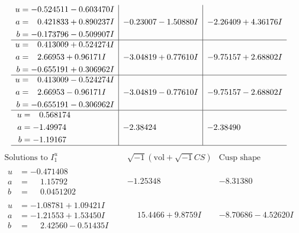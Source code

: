 \documentclass[1p]{elsarticle_modified}
\theoremstyle{definition}
\newcommand{\I}{\sqrt{-1}}
\begin{document}
$$\begin{array}{c|c|c}
\begin{aligned}
u &= -0.524511 - 0.603470 I \\
a &= \phantom{-}0.421833 + 0.890237 I \\
b &= -0.173796 - 0.509907 I\end{aligned}
 & -0.23007 - 1.50880 I & -2.26409 + 4.36176 I \\ \hline\begin{aligned}
u &= \phantom{-}0.413009 + 0.524274 I \\
a &= \phantom{-}2.66953 + 0.96171 I \\
b &= -0.655191 + 0.306962 I\end{aligned}
 & -3.04819 + 0.77610 I & -9.75157 + 2.68802 I \\ \hline\begin{aligned}
u &= \phantom{-}0.413009 - 0.524274 I \\
a &= \phantom{-}2.66953 - 0.96171 I \\
b &= -0.655191 - 0.306962 I\end{aligned}
 & -3.04819 - 0.77610 I & -9.75157 - 2.68802 I \\ \hline\begin{aligned}
u &= \phantom{-}0.568174\phantom{ +0.000000I} \\
a &= -1.49974\phantom{ +0.000000I} \\
b &= -1.19167\phantom{ +0.000000I}\end{aligned}
 & -2.38424\phantom{ +0.000000I} & -2.38490\phantom{ +0.000000I}\\
 \hline 
 \end{array}$$\newpage$$\begin{array}{c|c|c}  
\text{Solutions to }I^u_{1}& \I (\text{vol} + \sqrt{-1}CS) & \text{Cusp shape}\\
 \hline 
\begin{aligned}
u &= -0.471408\phantom{ +0.000000I} \\
a &= \phantom{-}1.15792\phantom{ +0.000000I} \\
b &= \phantom{-}0.0451202\phantom{ +0.000000I}\end{aligned}
 & -1.25348\phantom{ +0.000000I} & -8.31380\phantom{ +0.000000I} \\ \hline\begin{aligned}
u &= -1.08781 + 1.09421 I \\
a &= -1.21553 + 1.53450 I \\
b &= \phantom{-}2.42560 - 0.51435 I\end{aligned}
 & \phantom{-}15.4466 + 9.8759 I & -8.70686 - 4.52620 I \\ \hline\begin{aligned}

\end{aligned}
\end{array}$$
\end{document}
